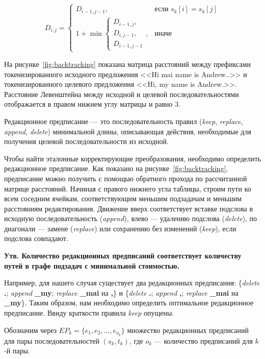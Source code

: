 \[
D_{i,j} = 
\begin{cases} 
    D_{i-1, j-1}, & \text{если } s_k[i] = s_k[j] \\
    1 + \min \begin{cases} 
        D_{i-1, j}, \\
        D_{i, j-1}, \\
        D_{i-1, j-1} 
    \end{cases}, & \text{иначе}
\end{cases}
\]

На рисунке~\ref{fig:backtracking} показана матрица расстояний между префиксами токенизированного исходного предложения <<Hi mai name is Andrew..>> и токенизированного целевого предложения <<Hi, my name is Andrew.>>. Расстояние Левенштейна между исходной и целевой последовательностями отображается в правом нижнем углу матрицы и равно 3.

Редакционное предписание — это последовательность правил (\textit{keep}, \textit{replace}, \textit{append}, \textit{delete}) минимальной длины, описывающая действия, необходимые для получения целевой последовательности из исходной.

Чтобы найти эталонные корректирующие преобразования, необходимо определить редакционное предписание. Как показано на рисунке~\ref{fig:backtracking}, предписание можно получить с помощью обратного прохода по рассчитанной матрице расстояний. Начиная с правого нижнего угла таблицы, строим пути ко всем соседним ячейкам, соответствующим меньшим подзадачам и меньшим расстояниям редактирования. Движение вверх соответствует вставке подслова в исходную последовательность (\textit{append}), влево — удалению подслова (\textit{delete}), по диагонали — замене (\textit{replace}) или сохранению без изменений (\textit{keep}), если подслова совпадают.

\textbf{Утв. Количество редакционных предписаний соответствует количеству путей в графе подзадач с минимальной стоимостью.}

Например, для нашего случая существует два редакционных предписания:  
\{\textit{delete} \textbf{.}; \textit{append} \textbf{\_my}; \textit{replace} \textbf{\_mai} на \textbf{,}\}  
и  
\{\textit{delete} \textbf{.}; \textit{append} \textbf{,}; \textit{replace} \textbf{\_mai} на \textbf{\_my}\}.  
Таким образом, нам необходимо определить оптимальное редакционное предписание. Ввиду краткости правила \textit{keep} опущены.

Обозначим через $EP_k = \{e_{1}, e_{2}, \ldots, e_{o_k}\}$ множество редакционных предписаний для пары последовательностей $(s_k, t_k)$, где $o_k$ — количество предписаний для $k$-й пары.

